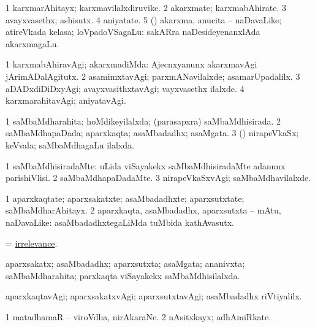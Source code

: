 \bentry
{}
\gl{\nA}
\bmng
\bnum
\num{1} karxmarAhitayx; karxmavilalxdiruvike. 
\num{2} akarxmate; karxmabAhirate. 
\num{3} avayxvasethx; ashisutx. 
\num{4} aniyatate. 
\num{5} (\kanmu) akarxma, anucita -- naDavaLike; atireVkada kelasa; loVpadoVSagaLu:  sakARra naDesideyenanxlAda akarxmagaLu. 
\enum
\emng
\eentry

\bentry
{}
\gl{\kirxvi}
\bmng
\bnum
\num{1} karxmabAhiravAgi; akarxmadiMda:  Ajecnxyanunx akarxmavAgi jArimADalAgitutx. 
\num{2} asamimxtavAgi; parxmANavilalxde; asamarUpadalilx. 
\num{3} aDADxdiDiDxyAgi; avayxvasithxtavAgi; vayxvasethx ilalxde. 
\num{4} karxmarahitavAgi; aniyatavAgi. 
\enum
\emng
\eentry

\bentry
{}
\gl{\gu}
\bmng
\bnum
\num{1} saMbaMdharahita; hoMdikeyilalxda; (parasapxra) saMbaMdhisirada. 
\num{2} saMbaMdhapaDada; aparxkaqta; asaMbadadhx; asaMgata. 
\num{3} (\tashA) nirapeVkaSx; keVvala; saMbaMdhagaLu ilalxda. 
\enum
\emng
\eentry

\bentry
{}
\gl{\kirxvi}
\bmng
\bnum
\num{1} saMbaMdhisiradaMte:  uLida viSayakekx saMbaMdhisiradaMte adanunx parishiVlisi. 
\num{2} saMbaMdhapaDadaMte. 
\num{3} nirapeVkaSxvAgi; saMbaMdhavilalxde. 
\enum
\emng
\eentry

\bentry
{}
\gl{\nA}
\bmng
\bnum
\num{1} aparxkaqtate; aparxsakatxte; asaMbadadhxte; aparxsutxtate; saMbaMdharAhitayx. 
\num{2} aparxkaqta, asaMbadadhx, aparxsutxta -- mAtu, naDavaLike:  asaMbadadhxtegaLiMda tuMbida kathAvasutx. 
\enum
\emng
\eentry

\bentry
{}
\gl{\nA}
\bmng
=  \hyperlink{irrelevance}{irrelevance}. 
\emng
\eentry

\bentry
{}
\gl{\gu}
\bmng
aparxsakatx; asaMbadadhx; aparxsutxta; asaMgata; ananivxta; saMbaMdharahita; parxkaqta viSayakekx saMbaMdhisilalxda. 
\emng
\eentry

\bentry
{}
\gl{\kirxvi}
\bmng
aparxkaqtavAgi; aparxsakatxvAgi; aparxsutxtavAgi; asaMbadadhx riVtiyalilx. 
\emng
\eentry

\bentry
{}
\gl{\nA}
\bmng
\bnum
\num{1} matadhamaR -- viroVdha, nirAkaraNe. 
\num{2} nAsitxkayx; adhAmiRkate. 
\enum
\emng
\eentry

